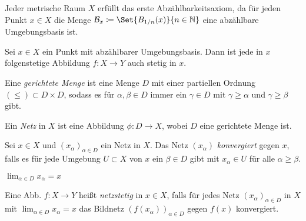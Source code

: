 \documentclass{cheat-sheet}
\begin{document}
\begin{bem}
  Jeder metrische Raum $X$ erfüllt das erste Abzählbarkeitsaxiom, da für jeden Punkt $x \in X$ die Menge $\mathcal{B}_x \coloneqq \Set{B_{1/n}(x)}{n\in\N}$ eine abzählbare Umgebungsbasis ist.
\end{bem}

\begin{prop}
  Sei $x \in X$ ein Punkt mit abzählbarer Umgebungsbasis. Dann ist jede in $x$ folgenstetige Abbildung $f : X \to Y$ auch stetig in $x$.
\end{prop}

\begin{defn}
  Eine \emph{gerichtete Menge} ist eine Menge $D$ mit einer partiellen Ordnung $(\le) \subset D \times D$, sodass es für $\alpha, \beta \in D$ immer ein $\gamma \in D$ mit $\gamma \geq \alpha$ und $\gamma \geq \beta$ gibt.
\end{defn}

\begin{defn}
  Ein \emph{Netz} in $X$ ist eine Abbildung $\phi : D \to X$, wobei $D$ eine gerichtete Menge ist.
\end{defn}

\iffalse
\begin{bspe}
  \begin{itemize}
    \item $D = (\N, \leq)$
    \item $X$ beliebige Menge, $D = (\mathcal{P}(X), \subseteq)$ oder $D = (\mathcal{P}(X), \supseteq)$
    \item Sei $(X, \tau)$ ein top. Raum, $x \in X$, $D \coloneqq (\Set{U \subset X}{\text{$U$ Umgebung von $x$}}, \leq)$ mit $U \leq V \coloneqq V \subset U$.
  \end{itemize}
\end{bspe}
\fi

\begin{defn}
  Sei $x \in X$ und $(x_\alpha)_{\alpha \in D}$ ein Netz in $X$. Das Netz $(x_\alpha)$ \emph{konvergiert} gegen $x$, falls es für jede Umgebung $U \subset X$ von $x$ ein $\beta \in D$ gibt mit $x_\alpha \in U$ für alle $\alpha \geq \beta$.
\end{defn}

\begin{nota}
  $\lim_{\alpha \in D} x_\alpha = x$
\end{nota}

\begin{defn}
  Eine Abb. $f : X \to Y$ heißt \emph{netzstetig} in $x \in X$, falls für jedes Netz $(x_\alpha)_{\alpha \in D}$ in $X$ mit $\lim_{\alpha \in D} x_\alpha = x$ das Bildnetz $(f(x_\alpha))_{\alpha \in D}$ gegen $f(x)$ konvergiert.
\end{defn}
\end{document}
